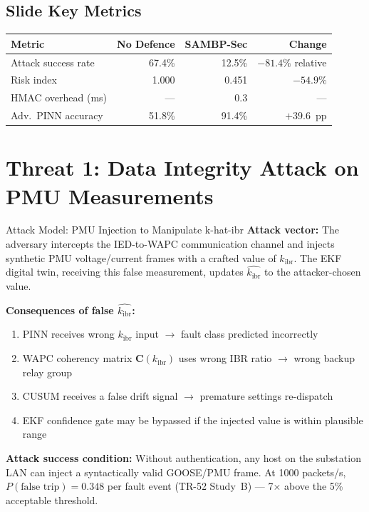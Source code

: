\documentclass[12pt,a4paper]{article}
\newcommand{\kibr}{k_\mathrm{ibr}}
\begin{document}
\subsection{Slide Key Metrics}

\begin{center}
\begin{tabular}{@{}lrrr@{}}
\toprule
\textbf{Metric} & \textbf{No Defence} & \textbf{SAMBP-Sec} & \textbf{Change} \\
\midrule
Attack success rate   & 67.4\%  & 12.5\%  & $-81.4\%$ relative \\
Risk index            & 1.000   & 0.451   & $-54.9\%$ \\
HMAC overhead (ms)    & ---     & 0.3     & --- \\
Adv.\ PINN accuracy  & 51.8\%  & 91.4\%  & $+39.6$~pp \\
\bottomrule
\end{tabular}
\end{center}

\section{Threat 1: Data Integrity Attack on PMU Measurements}

\begin{threatbox}{Attack Model: PMU Injection to Manipulate k-hat-ibr}
\textbf{Attack vector:} The adversary intercepts the IED-to-WAPC communication channel and injects synthetic PMU voltage/current frames with a crafted value of $\kibr$. The EKF digital twin, receiving this false measurement, updates $\hat{\kibr}$ to the attacker-chosen value.

\textbf{Consequences of false $\hat{\kibr}$:}
\begin{enumerate}[nosep]
  \item PINN receives wrong $\kibr$ input $\to$ fault class predicted incorrectly
  \item WAPC coherency matrix $\mathbf{C}(\kibr)$ uses wrong IBR ratio $\to$ wrong backup relay group
  \item CUSUM receives a false drift signal $\to$ premature settings re-dispatch
  \item EKF confidence gate may be bypassed if the injected value is within plausible range
\end{enumerate}

\textbf{Attack success condition:} Without authentication, any host on the substation LAN can inject a syntactically valid GOOSE/PMU frame. At 1000 packets/s, $P(\text{false trip}) = 0.348$ per fault event (TR-52 Study~B) --- 7$\times$ above the 5\% acceptable threshold.
\end{threatbox}
\end{document}
